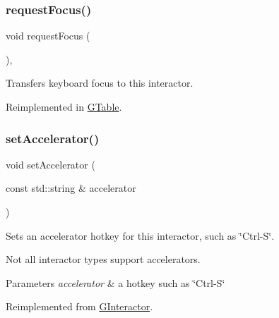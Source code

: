 \mbox{\label{classGInteractor_a519fb2ac767f8b2febbb50b898b8c8cb}} 
\subsubsection{\texorpdfstring{request\+Focus()}{requestFocus()}}
{\footnotesize\ttfamily void request\+Focus (\begin{DoxyParamCaption}{ }\end{DoxyParamCaption})\hspace{0.3cm}{\ttfamily [virtual]}, {\ttfamily [inherited]}}



Transfers keyboard focus to this interactor. 



Reimplemented in \mbox{\hyperlink{classGTable_a49b39e0eeaf5af829e8956e9055c5cdc}{G\+Table}}.

\mbox{\label{classGButton_a5f78fc506a33b57dced42a419be34446}} 
\subsubsection{\texorpdfstring{set\+Accelerator()}{setAccelerator()}}
{\footnotesize\ttfamily void set\+Accelerator (\begin{DoxyParamCaption}\item[{const std\+::string \&}]{accelerator }\end{DoxyParamCaption})\hspace{0.3cm}{\ttfamily [virtual]}}



Sets an accelerator hotkey for this interactor, such as \char`\"{}\+Ctrl-\/\+S\char`\"{}. 

Not all interactor types support accelerators. 
\begin{DoxyParams}{Parameters}
{\em accelerator} & a hotkey such as \char`\"{}\+Ctrl-\/\+S\char`\"{} \\
\hline
\end{DoxyParams}


Reimplemented from \mbox{\hyperlink{classGInteractor_ad15f102f62e2960576012f1aa0ba4b2e}{G\+Interactor}}.

